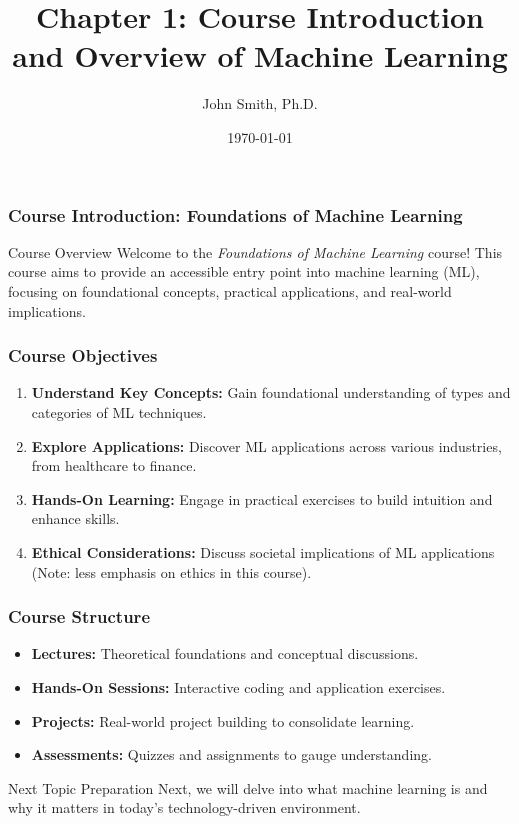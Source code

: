 \documentclass[aspectratio=169]{beamer}
\title[Course Introduction]{Chapter 1: Course Introduction and Overview of Machine Learning}
\author[J. Smith]{John Smith, Ph.D.}
\institute[University Name]{
  Department of Computer Science\\
  University Name\\
  \vspace{0.3cm}
  Email: email@university.edu\\
  Website: www.university.edu
}
\date{\today}
\begin{document}
\frame{\titlepage}

\begin{frame}[fragile]
    \frametitle{Course Introduction: Foundations of Machine Learning}
    \begin{block}{Course Overview}
        Welcome to the \textit{Foundations of Machine Learning} course! This course aims to provide an accessible entry point into machine learning (ML), focusing on foundational concepts, practical applications, and real-world implications.
    \end{block}
\end{frame}

\begin{frame}[fragile]
    \frametitle{Course Objectives}
    \begin{enumerate}
        \item \textbf{Understand Key Concepts:} Gain foundational understanding of types and categories of ML techniques.
        \item \textbf{Explore Applications:} Discover ML applications across various industries, from healthcare to finance.
        \item \textbf{Hands-On Learning:} Engage in practical exercises to build intuition and enhance skills.
        \item \textbf{Ethical Considerations:} Discuss societal implications of ML applications (Note: less emphasis on ethics in this course).
    \end{enumerate}
\end{frame}

\begin{frame}[fragile]
    \frametitle{Course Structure}
    \begin{itemize}
        \item \textbf{Lectures:} Theoretical foundations and conceptual discussions.
        \item \textbf{Hands-On Sessions:} Interactive coding and application exercises.
        \item \textbf{Projects:} Real-world project building to consolidate learning.
        \item \textbf{Assessments:} Quizzes and assignments to gauge understanding.
    \end{itemize}

    \begin{block}{Next Topic Preparation}
        Next, we will delve into what machine learning is and why it matters in today's technology-driven environment.
    \end{block}
\end{frame}
\end{document}
